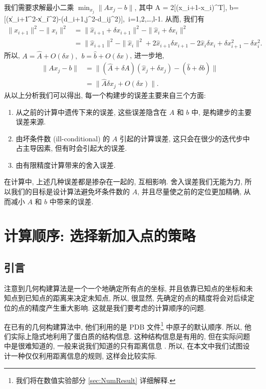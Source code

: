 \documentclass{CASthesis_zzk}
\begin{document}
我们需要求解最小二乘 $\min_{x_j} \|Ax_j-b\|$, 其中
\be A = 2[(x_{i+1}-x_i)^T], b=[(\|x_{i+1}\|^2-\|x_i\|^2)-(d_{i+1,j}^2-d_{ij}^2)],~i=1,2,\ldots,l-1.\ee
从而, 我们有
\begin{align}
  \|x_{i+1}\|^2-\|x_i\|^2 & = \|\widehat{x}_{i+1}+\delta x_{i+1}\|^2-\|\widehat{x}_i+\delta x_i\|^2    \\
  & = \|\widehat{x}_{i+1}\|^2-\|\widehat{x}_i\|^2 + 2\widehat{x}_{i+1}\delta x_{i+1} - 2\widehat{x}_i\delta x_i + \delta x_{i+1}^2-\delta x_i^2.
\end{align}
所以, $A=\widehat{A}+O(\delta x),~~b=\widehat{b}+O(\delta x)$, 进一步地, 
\begin{align}
  \|Ax_j-b\| & =\|(\widehat{A}+\delta A)(\widehat{x}_j+\delta x_j)-(\widehat{b} + \delta b)\| \\
  & =\|\widehat{A} \delta x_j + O(\delta x)\|.
\end{align}
从以上分析我们可以得出, 每一个构建步的误差主要来自三个方面:
\begin{enumerate}
  \item 从之前的计算中遗传下来的误差, 这些误差隐含在 $A$ 和 $b$ 中, 是构建步的主要误差来源.
  \item 由坏条件数 (ill-conditional) 的 $A$ 引起的计算误差, 这只会在很少的迭代步中占主导因素, 但有时会引起大的误差.
  \item 由有限精度计算带来的舍入误差.
\end{enumerate}

在计算中, 上述几种误差都是掺杂在一起的, 互相影响.
舍入误差我们无能为力, 所以我们的目标是设计算法避免坏条件数的 $A$,
并且尽量使之前的定位更加精确, 从而减小 $A$ 和 $b$ 中带来的误差.


\section{计算顺序: 选择新加入点的策略}
\label{sec:CompOrder}

\subsection{引言}
注意到几何构建算法是一个一个地确定所有点的坐标, 
并且依靠已知点的坐标和未知点到已知点的距离来决定未知点,
所以, 很显然, 先确定的点的精度将会对后续定位的点的精度产生重大影响.
这就是我们要考虑的计算顺序的问题.

在已有的几何构建算法中, 他们利用的是 PDB 文件\footnote{我们将在数值实验部分 \ref{sec:NumResult} 详细解释.}
中原子的默认顺序.
所以, 他们实际上隐式地利用了蛋白质的结构信息.
这种结构信息是有用的, 但在实际问题中是很难知道的, 
一般来说我们知道的只有距离信息 \cite{Dong2002}.
所以, 在本文中我们试图设计一种仅仅利用距离信息的规则,
这样会比较实际.
\end{document}
